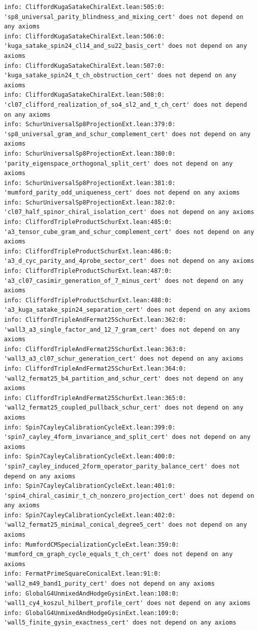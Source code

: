 \documentclass[11pt,a4paper]{article}
\begin{document}
\begin{lstlisting}[language={},basicstyle=\ttfamily\scriptsize,caption={Representative \texttt{lake clean \&\& lake build} zero-axiom receipts across Experiments~12--19 (all $107$ public receipts archived in \texttt{MILLENNIUM\_EXT\_RECEIPT.json}).}]
info: CliffordKugaSatakeChiralExt.lean:505:0: 'sp8_universal_parity_blindness_and_mixing_cert' does not depend on any axioms
info: CliffordKugaSatakeChiralExt.lean:506:0: 'kuga_satake_spin24_cl14_and_su22_basis_cert' does not depend on any axioms
info: CliffordKugaSatakeChiralExt.lean:507:0: 'kuga_satake_spin24_t_ch_obstruction_cert' does not depend on any axioms
info: CliffordKugaSatakeChiralExt.lean:508:0: 'cl07_clifford_realization_of_so4_sl2_and_t_ch_cert' does not depend on any axioms
info: SchurUniversalSp8ProjectionExt.lean:379:0: 'sp8_universal_gram_and_schur_complement_cert' does not depend on any axioms
info: SchurUniversalSp8ProjectionExt.lean:380:0: 'parity_eigenspace_orthogonal_split_cert' does not depend on any axioms
info: SchurUniversalSp8ProjectionExt.lean:381:0: 'mumford_parity_odd_uniqueness_cert' does not depend on any axioms
info: SchurUniversalSp8ProjectionExt.lean:382:0: 'cl07_half_spinor_chiral_isolation_cert' does not depend on any axioms
info: CliffordTripleProductSchurExt.lean:485:0: 'a3_tensor_cube_gram_and_schur_complement_cert' does not depend on any axioms
info: CliffordTripleProductSchurExt.lean:486:0: 'a3_d_cyc_parity_and_4probe_sector_cert' does not depend on any axioms
info: CliffordTripleProductSchurExt.lean:487:0: 'a3_cl07_casimir_generation_of_7_minus_cert' does not depend on any axioms
info: CliffordTripleProductSchurExt.lean:488:0: 'a3_kuga_satake_spin24_separation_cert' does not depend on any axioms
info: CliffordTripleAndFermat25SchurExt.lean:362:0: 'wall3_a3_single_factor_and_12_7_gram_cert' does not depend on any axioms
info: CliffordTripleAndFermat25SchurExt.lean:363:0: 'wall3_a3_cl07_schur_generation_cert' does not depend on any axioms
info: CliffordTripleAndFermat25SchurExt.lean:364:0: 'wall2_fermat25_b4_partition_and_schur_cert' does not depend on any axioms
info: CliffordTripleAndFermat25SchurExt.lean:365:0: 'wall2_fermat25_coupled_pullback_schur_cert' does not depend on any axioms
info: Spin7CayleyCalibrationCycleExt.lean:399:0: 'spin7_cayley_4form_invariance_and_split_cert' does not depend on any axioms
info: Spin7CayleyCalibrationCycleExt.lean:400:0: 'spin7_cayley_induced_2form_operator_parity_balance_cert' does not depend on any axioms
info: Spin7CayleyCalibrationCycleExt.lean:401:0: 'spin4_chiral_casimir_t_ch_nonzero_projection_cert' does not depend on any axioms
info: Spin7CayleyCalibrationCycleExt.lean:402:0: 'wall2_fermat25_minimal_conical_degree5_cert' does not depend on any axioms
info: MumfordCMSpecializationCycleExt.lean:359:0: 'mumford_cm_graph_cycle_equals_t_ch_cert' does not depend on any axioms
info: FermatPrimeSquareConicalExt.lean:91:0: 'wall2_m49_band1_purity_cert' does not depend on any axioms
info: GlobalG4UnmixedAndHodgeGysinExt.lean:108:0: 'wall1_cy4_koszul_hilbert_profile_cert' does not depend on any axioms
info: GlobalG4UnmixedAndHodgeGysinExt.lean:109:0: 'wall5_finite_gysin_exactness_cert' does not depend on any axioms
\end{lstlisting}
\end{document}
